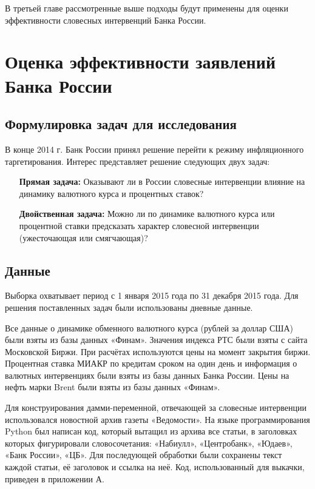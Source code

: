 В третьей главе рассмотренные выше подходы будут применены для оценки эффективности словесных интервенций Банка России.


\chapter{Оценка эффективности заявлений Банка России}

\section{Формулировка задач для исследования}

В конце 2014 г. Банк России принял решение перейти к режиму инфляционного таргетирования. Интерес представляет решение следующих двух задач:

\begin{enumerate}

\item[\textbf{Прямая задача:}] Оказывают ли в России словесные интервенции влияние на динамику валютного курса и процентных ставок?

\item[\textbf{Двойственная задача:}] Можно ли по динамике валютного курса или процентной ставки предсказать характер словесной интервенции (ужесточающая или смягчающая)?
\end{enumerate}

\section{Данные}

Выборка охватывает период с 1 января 2015 года по 31 декабря 2015 года. Для решения поставленных задач были использованы дневные данные. 

Все данные о динамике обменного валютного курса (рублей за доллар США)  были взяты из базы данных  «Финам». Значения индекса РТС были взяты с сайта Московской Биржи. При расчётах используются цены на момент закрытия биржи. Процентная ставка МИАКР по кредитам сроком на один день и информация о валютных интервенциях были взяты из базы данных Банка России. Цены на нефть марки Brent были взяты из базы данных «Финам».

Для конструирования дамми-переменной, отвечающей за словесные интервенции использовался новостной архив газеты «Ведомости». На языке программирования Python был написан код, который вытащил из архива все статьи, в заголовках которых фигурировали словосочетания: «Набиулл», «Центробанк», «Юдаев», «Банк России», «ЦБ». Для последующей обработки были сохранены текст каждой статьи, её заголовок и ссылка на неё. Код, использованный для выкачки, приведен в приложении А.  


